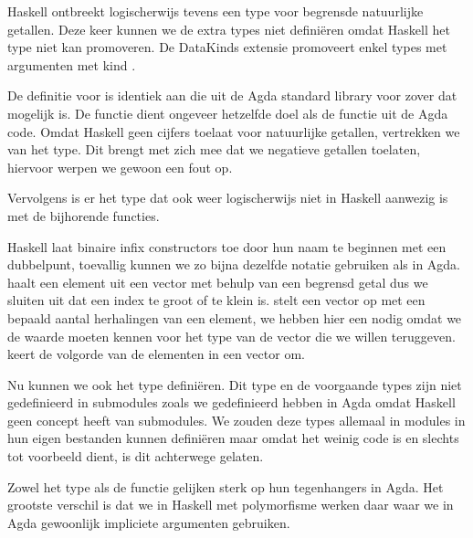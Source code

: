 Haskell ontbreekt logischerwijs tevens een type voor begrensde natuurlijke
getallen. Deze keer kunnen we de extra types niet definiëren omdat Haskell het
 type niet kan promoveren. De DataKinds extensie promoveert enkel
types met argumenten met kind \ihask{*}.


De definitie voor  is identiek aan die uit de Agda standard
library voor zover dat mogelijk is. De functie  dient ongeveer
hetzelfde doel als de  functie uit de Agda code. Omdat Haskell
geen cijfers toelaat voor natuurlijke getallen, vertrekken we van het
 type. Dit brengt met zich mee dat we negatieve getallen
toelaten, hiervoor werpen we gewoon een fout op.

Vervolgens is er het type  dat ook weer logischerwijs niet in
Haskell aanwezig is met de bijhorende functies.


Haskell laat binaire infix constructors toe door hun naam te beginnen met een
dubbelpunt, toevallig kunnen we zo bijna dezelfde notatie gebruiken als in
Agda.  haalt een element uit een vector met behulp van een
begrensd getal dus we sluiten uit dat een index te groot of te klein is.
 stelt een vector op met een bepaald aantal herhalingen van
een element, we hebben hier een  nodig omdat we de waarde
 moeten kennen voor het type van de vector die we willen teruggeven.
 keert de volgorde van de elementen in een vector om.

Nu kunnen we ook het  type definiëren. Dit type en de voorgaande
types zijn niet gedefinieerd in submodules zoals we  gedefinieerd
hebben in Agda omdat Haskell geen concept heeft van submodules. We zouden deze
types allemaal in modules in hun eigen bestanden kunnen definiëren maar omdat
het weinig code is en slechts tot voorbeeld dient, is dit achterwege gelaten.


Zowel het  type als de  functie gelijken sterk op
hun tegenhangers in Agda. Het grootste verschil is dat we in Haskell met
polymorfisme werken daar waar we in Agda gewoonlijk impliciete argumenten
gebruiken.


